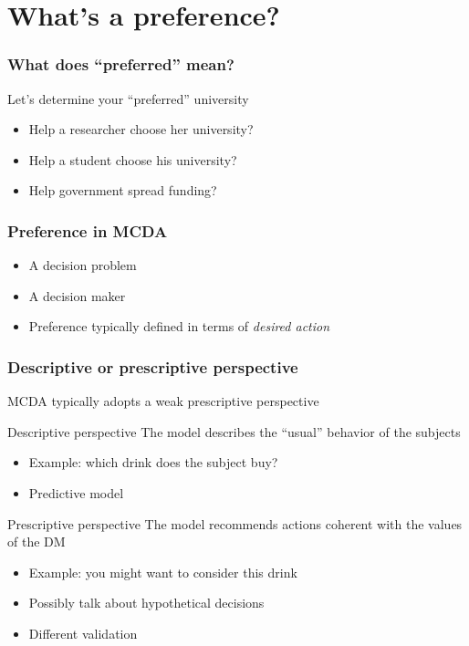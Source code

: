 \documentclass[french,english]{beamer}
\begin{document}
\section[Preference]{What’s a preference?}
\begin{frame}
	\frametitle{What does “preferred” mean?}
	Let’s determine your “preferred” university
	\begin{itemize}
		\item Help a researcher choose her university?
		\item Help a student choose his university?
		\item Help government spread funding?
	\end{itemize}
\end{frame}

\begin{frame}
	\frametitle{Preference in MCDA}
	\begin{itemize}
		\item A decision problem
		\item A decision maker
		\item Preference {\tiny typically} defined in terms of \emph{desired action}
	\end{itemize}
\end{frame}

\begin{frame}
	\frametitle{Descriptive or prescriptive perspective}
	MCDA {\tiny typically} adopts a {\tiny weak} prescriptive perspective
	\begin{block}{Descriptive perspective}
		The model describes the “usual” behavior of the subjects
		\begin{itemize}
			\item Example: which drink does the subject buy?
			\item Predictive model
		\end{itemize}
	\end{block}
	\begin{block}{Prescriptive perspective}
		The model recommends actions coherent with the values of the \ac{DM}
		\begin{itemize}
			\item Example: you might want to consider this drink
			\item Possibly talk about hypothetical decisions
			\item Different validation
		\end{itemize}
	\end{block}
\end{frame}
\end{document}
